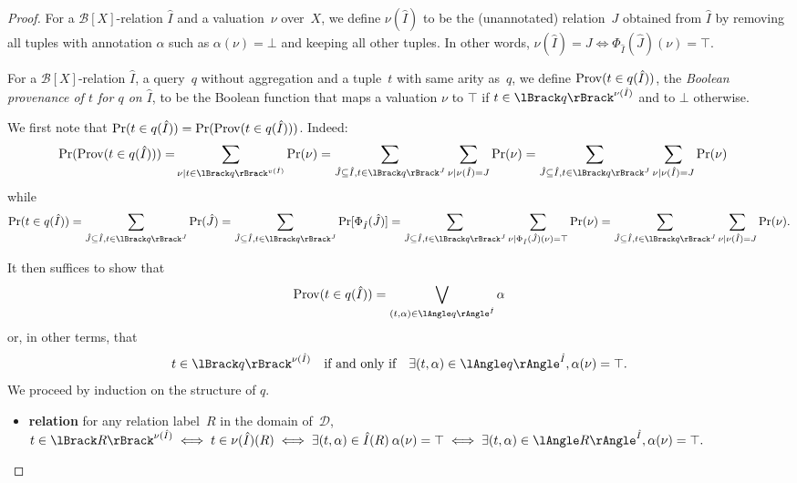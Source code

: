 \begin{proof}
	For a $\mathcal{B}[X]$-relation $\hat I$ and a valuation~$\nu$
	over~$X$, we define $\nu(\hat I)$ to be the (unannotated) relation~$J$
	obtained from $\hat I$ by removing all tuples with annotation $\alpha$
	such as $\alpha(\nu)=\bot$ and keeping all other tuples. In other
	words, $\nu(\hat I)=J\iff\Phi_{\hat I}(\hat J)(\nu)=\top$.

	For a $\mathcal{B}[X]$-relation $\hat I$, a query~$q$ without
	aggregation and a tuple~$t$ with same arity as~$q$, we define
	$\operatorname{Prov}(t\in q(\hat I))$, the \emph{Boolean provenance of $t$ for $q$ on
		$\hat I$}, to be the Boolean function that maps a valuation $\nu$
	to $\top$ if $t\in \sem{\nu(\hat I)}{q}$ and to $\bot$ otherwise.

	We first note that $\Pr(t\in q(\hat I))=\Pr(\operatorname{Prov}(t\in q(\hat I)))$.
	Indeed:
	\begin{align*}
		\Pr(\Prov(t\in q(\hat I)))
		= & \sum_{\nu\mid t\in \sem{v(\hat I)}{q}}\Pr(\nu)
		=\sum_{\hat J\subseteq \hat I,t\in\sem{J}{q}}\sum_{\nu\mid\nu(\hat I)=J}\Pr(\nu)
		=\sum_{\hat J\subseteq \hat I,t\in\sem{J}{q}}\sum_{\nu\mid\nu(\hat I)=J}\Pr(\nu)
	\end{align*}
	while
	\begin{align*}
		\Pr(t\in q(\hat I))=\sum_{\hat J\subseteq\hat I,
			t\in\sem{J}{q}}\Pr(\hat J)
		=\sum_{\hat J\subseteq \hat I,t\in\sem{J}{q}}\Pr[\Phi_{\hat I}(\hat J)]
		=\sum_{\hat J\subseteq \hat I,t\in\sem{J}{q}}\sum_{\nu|\Phi_{\hat I}(\hat J)(\nu)=\top}\Pr(\nu)
		=\sum_{\hat J\subseteq \hat I,t\in\sem{J}{q}}\sum_{\nu|\nu(\hat
			I)=J}\Pr(\nu).
	\end{align*}

	It then suffices to show that
	\[\Prov(t\in q(\hat I))=\bigvee_{(t,\alpha)\in\ansem{\hat
				I}{q}}\alpha\]
	or, in other terms, that
	\[t\in \sem{\nu(\hat I)}{q} \quad\text{if and only if}\quad \exists
		(t,\alpha)\in\ansem{\hat I}{q}, \alpha(\nu)=\top.\]
	We proceed by induction on the structure of $q$.

	\begin{itemize}
		\item \textbf{relation} for any relation label~$R$ in the domain
			of~$\mathcal{D}$,
			\(
			t\in \sem{\nu(\hat I)}{R}
			\iff
			t\in \nu(\hat I)(R)
			\iff
			\exists(t,\alpha)\in\hat I(R)\: \alpha(\nu)=\top
			\iff
			\exists(t,\alpha)\in\ansem{\hat I}{R}, \alpha(\nu)=\top.
			\)


\end{itemize}
\end{proof}
